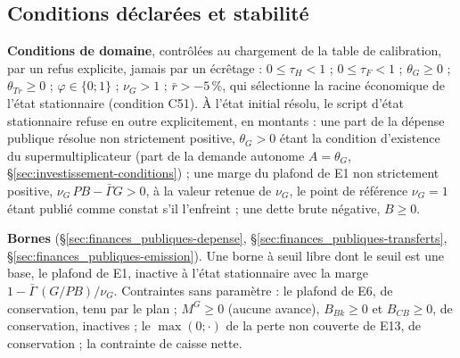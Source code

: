 \documentclass[11pt,a4paper]{article}
\begin{document}
\subsection{Conditions déclarées et stabilité}
\label{sec:finances_publiques-conditions}
\begin{proposee}
\textbf{Conditions de domaine}, contrôlées au chargement de la table de calibration, par un refus explicite, jamais par un écrêtage : $0 \le \tau_H < 1$ ; $0 \le \tau_F < 1$ ; $\theta_G \ge 0$ ; $\theta_{\mathit{Tr}} \ge 0$ ; $\varphi \in \{0 ; 1\}$ ; $\nu_G > 1$ ; $\bar r > -5\,\%$, qui sélectionne la racine économique de l'état stationnaire (condition C51). À l'état initial résolu, le script d'état stationnaire refuse en outre explicitement, en montants : une part de la dépense publique résolue non strictement positive, $\theta_G > 0$ étant la condition d'existence du supermultiplicateur (part de la demande autonome $A = \theta_G$, \S\ref{sec:investissement-conditions}) ; une marge du plafond de E1 non strictement positive, $\nu_G\,\mathit{PB} - \bar\Gamma G > 0$, à la valeur retenue de $\nu_G$, le point de référence $\nu_G = 1$ étant publié comme constat s'il l'enfreint ; une dette brute négative, $B \ge 0$.

\textbf{Bornes} (\S\ref{sec:finances_publiques-depense}, \S\ref{sec:finances_publiques-transferts}, \S\ref{sec:finances_publiques-emission}). Une borne à seuil libre dont le seuil est une base, le plafond de E1, inactive à l'état stationnaire avec la marge $1 - \bar\Gamma\,(G/\mathit{PB})/\nu_G$. Contraintes sans paramètre : le plafond de E6, de conservation, tenu par le plan ; $M^G \ge 0$ (aucune avance), $B_{\mathit{Bk}} \ge 0$ et $B_{\mathit{CB}} \ge 0$, de conservation, inactives ; le $\max(0 ; \cdot)$ de la perte non couverte de E13, de conservation ; la contrainte de caisse nette.


\end{proposee}
\end{document}
